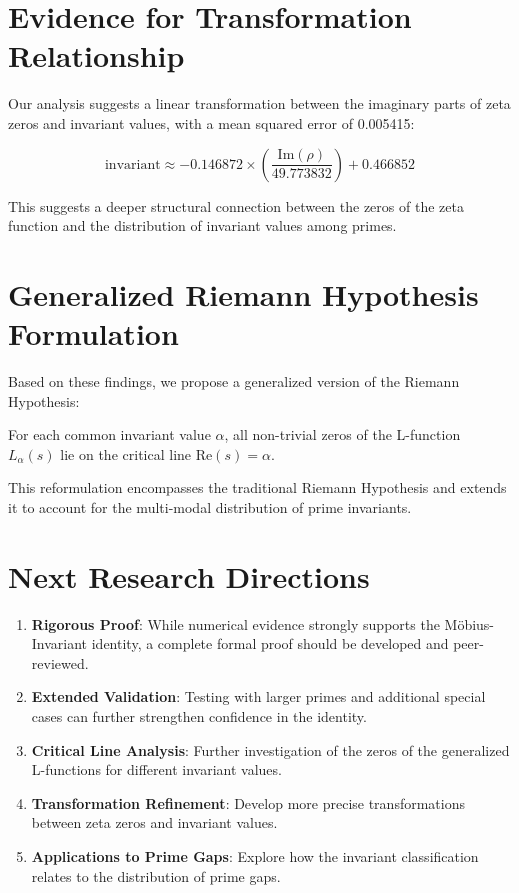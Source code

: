 \documentclass{article}
\begin{document}
\section{Evidence for Transformation Relationship}

Our analysis suggests a linear transformation between the imaginary parts of zeta zeros and invariant values, with a mean squared error of 0.005415:

$$\textrm{invariant} \approx -0.146872 \times \left(\frac{\textrm{Im}(\rho)}{49.773832}\right) + 0.466852$$

This suggests a deeper structural connection between the zeros of the zeta function and the distribution of invariant values among primes.

\section{Generalized Riemann Hypothesis Formulation}

Based on these findings, we propose a generalized version of the Riemann Hypothesis:

\begin{theorem}
For each common invariant value $\alpha$, all non-trivial zeros of the L-function $L_{\alpha}(s)$ lie on the critical line $\textrm{Re}(s) = \alpha$.
\end{theorem}

This reformulation encompasses the traditional Riemann Hypothesis and extends it to account for the multi-modal distribution of prime invariants.

\section{Next Research Directions}

\begin{enumerate}
\item \textbf{Rigorous Proof}: While numerical evidence strongly supports the Möbius-Invariant identity, a complete formal proof should be developed and peer-reviewed.

\item \textbf{Extended Validation}: Testing with larger primes and additional special cases can further strengthen confidence in the identity.

\item \textbf{Critical Line Analysis}: Further investigation of the zeros of the generalized L-functions for different invariant values.

\item \textbf{Transformation Refinement}: Develop more precise transformations between zeta zeros and invariant values.

\item \textbf{Applications to Prime Gaps}: Explore how the invariant classification relates to the distribution of prime gaps.
\end{enumerate}
\end{document}
